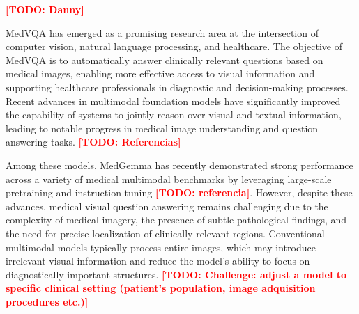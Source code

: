 \documentclass[runningheads]{llncs}
\newcommand{\todo}[1]{\textcolor{red}{\textbf{[TODO: #1]}}}
\begin{document}
\todo{Danny}




\gls{MedVQA} has emerged as a promising research area at the intersection of computer vision, natural language processing, and healthcare. The objective of \gls{MedVQA} is to automatically answer clinically relevant questions based on medical images, enabling more effective access to visual information and supporting healthcare professionals in diagnostic and decision-making processes. Recent advances in multimodal foundation models have significantly improved the capability of systems to jointly reason over visual and textual information, leading to notable progress in medical image understanding and question answering tasks. \todo{Referencias}

Among these models, MedGemma has recently demonstrated strong performance across a variety of medical multimodal benchmarks by leveraging large-scale pretraining and instruction tuning \todo{referencia}. However, despite these advances, medical visual question answering remains challenging due to the complexity of medical imagery, the presence of subtle pathological findings, and the need for precise localization of clinically relevant regions. Conventional multimodal models typically process entire images, which may introduce irrelevant visual information and reduce the model's ability to focus on diagnostically important structures. \todo{Challenge: adjust a model to specific clinical setting (patient's population, image adquisition procedures etc.)}
\end{document}

